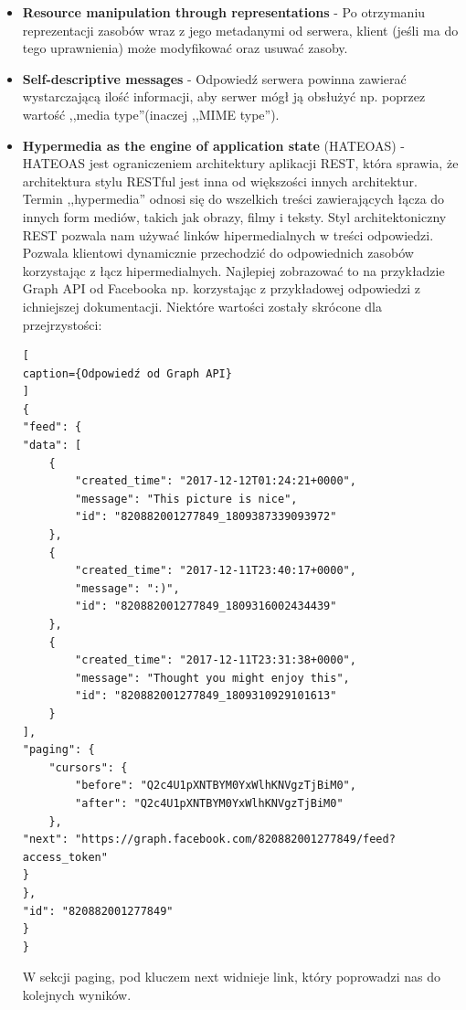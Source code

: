 \documentclass[oneside,polski,logo,indent]{amuthesis}
\begin{document}
\begin{itemize}
\begin{itemize}
\item \textbf{Resource manipulation through representations} - Po otrzymaniu reprezentacji zasobów wraz z jego metadanymi od serwera, klient (jeśli ma do tego uprawnienia) może modyfikować oraz usuwać zasoby.\newline 

\item \textbf{Self-descriptive messages} - Odpowiedź serwera powinna zawierać wystarczającą ilość informacji, aby serwer mógł ją obsłużyć np. poprzez wartość ,,media type''(inaczej ,,MIME type'').\newline 

\item \textbf{Hypermedia as the engine of application state} (HATEOAS) - HATEOAS jest ograniczeniem architektury aplikacji REST, która sprawia, że architektura stylu RESTful jest inna od większości innych architektur. Termin ,,hypermedia'' odnosi się do wszelkich treści zawierających łącza do innych form mediów, takich jak obrazy, filmy i teksty. Styl architektoniczny REST pozwala nam używać linków hipermedialnych w treści odpowiedzi. Pozwala klientowi dynamicznie przechodzić do odpowiednich zasobów korzystając z łącz hipermedialnych. Najlepiej zobrazować to na przykładzie Graph API od Facebooka np. korzystając z przykładowej odpowiedzi z ichniejszej dokumentacji. Niektóre wartości zostały skrócone dla przejrzystości: 

\begin{lstlisting}[
caption={Odpowiedź od Graph API}
]
{
"feed": {
"data": [
    {
        "created_time": "2017-12-12T01:24:21+0000",
        "message": "This picture is nice",
        "id": "820882001277849_1809387339093972"
    },
    {
        "created_time": "2017-12-11T23:40:17+0000",
        "message": ":)",
        "id": "820882001277849_1809316002434439"
    },
    {
        "created_time": "2017-12-11T23:31:38+0000",
        "message": "Thought you might enjoy this",
        "id": "820882001277849_1809310929101613"
    }
],
"paging": {
    "cursors": {
        "before": "Q2c4U1pXNTBYM0YxWlhKNVgzTjBiM0",
        "after": "Q2c4U1pXNTBYM0YxWlhKNVgzTjBiM0"
    },
"next": "https://graph.facebook.com/820882001277849/feed?access_token"
}
},
"id": "820882001277849"
}
}
\end{lstlisting}

W sekcji paging, pod kluczem next widnieje link, który poprowadzi nas do kolejnych wyników.\newline 
\end{itemize}


\end{itemize}
\end{document}
